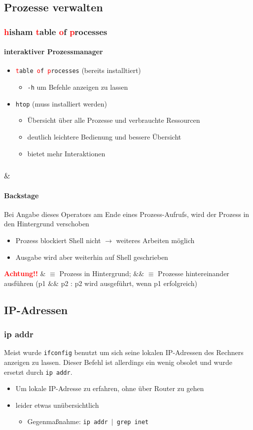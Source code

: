 \documentclass[12pt,utf8]{beamer}
\begin{document}
\subsection{Prozesse verwalten}
\begin{frame}
\frametitle{\textcolor{red}{h}isham \textcolor{red}{t}able \textcolor{red}{o}f \textcolor{red}{p}rocesses}
\framesubtitle{interaktiver Prozessmanager}
\begin{itemize}
	\item \texttt{\textcolor{red}{t}able \textcolor{red}{o}f \textcolor{red}{p}rocesses} (bereits installtiert)
	\begin{itemize}[<+->]
		\item {\scriptsize \texttt{-h} um Befehle anzeigen zu lassen}
	\end{itemize}
	\item \texttt{htop} (muss installiert werden)
	\begin{itemize}[<+->]
		\item {\scriptsize Übersicht über alle Prozesse und verbrauchte Ressourcen}
		\item {\scriptsize deutlich leichtere Bedienung und bessere Übersicht}
		\item {\scriptsize bietet mehr Interaktionen}
	\end{itemize}
\end{itemize}
\end{frame}

\begin{frame}
\frametitle{$\&$}
\framesubtitle{Backstage}
Bei Angabe dieses Operators am Ende eines Prozess-Aufrufs, wird der Prozess in den Hintergrund verschoben
\begin{itemize}
	\item Prozess blockiert Shell nicht $\to$ weiteres Arbeiten möglich
	\item Ausgabe wird aber weiterhin auf Shell geschrieben
\end{itemize}
\textbf{\textcolor{red}{Achtung!!}} $\&$ $\equiv$ Prozess in Hintergrund; $\&\&$ $\equiv$ Prozesse hintereinander ausführen (p1 $\&\&$ p2 : p2 wird ausgeführt, wenn p1 erfolgreich)
\end{frame}

\subsection{IP-Adressen}
\begin{frame}
	\frametitle{ip addr}
	Meist wurde \texttt{ifconfig} benutzt um sich seine lokalen IP-Adressen des Rechners anzeigen zu lassen. Dieser Befehl ist allerdings ein wenig obsolet und wurde ersetzt durch \texttt{ip addr}.
	\begin{itemize}
		\item Um lokale IP-Adresse zu erfahren, ohne über Router zu gehen
		\item leider etwas unübersichtlich
		\begin{itemize}
			\item {\scriptsize Gegenmaßnahme: \texttt{ip addr $\mid$ grep inet}}
		\end{itemize}
	\end{itemize}
\end{frame}
\end{document}
